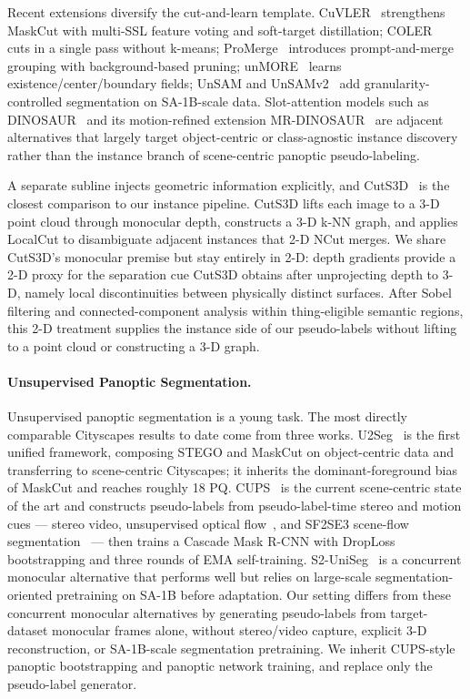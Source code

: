 \documentclass[10pt,twocolumn,letterpaper]{article}
\begin{document}
Recent extensions diversify the cut-and-learn template. CuVLER~\cite{arica2024cuvler} strengthens MaskCut with multi-SSL feature voting and soft-target distillation; COLER~\cite{feng2025coler} cuts in a single pass without k-means; ProMerge~\cite{li2024promerge} introduces prompt-and-merge grouping with background-based pruning; unMORE~\cite{yang2025unmore} learns existence/center/boundary fields; UnSAM and UnSAMv2~\cite{wang2024unsam,yu2025unsamv2} add granularity-controlled segmentation on SA-1B-scale data. Slot-attention models such as DINOSAUR~\cite{seitzer2023dinosaur} and its motion-refined extension MR-DINOSAUR~\cite{gong2025mrdinosaur} are adjacent alternatives that largely target object-centric or class-agnostic instance discovery rather than the instance branch of scene-centric panoptic pseudo-labeling.

A separate subline injects geometric information explicitly, and CutS3D~\cite{sick2025cuts3d} is the closest comparison to our instance pipeline. CutS3D lifts each image to a 3-D point cloud through monocular depth, constructs a 3-D k-NN graph, and applies LocalCut to disambiguate adjacent instances that 2-D NCut merges. We share CutS3D's monocular premise but stay entirely in 2-D: depth gradients provide a 2-D proxy for the separation cue CutS3D obtains after unprojecting depth to 3-D, namely local discontinuities between physically distinct surfaces. After Sobel filtering and connected-component analysis within thing-eligible semantic regions, this 2-D treatment supplies the instance side of our pseudo-labels without lifting to a point cloud or constructing a 3-D graph.

\paragraph{Unsupervised Panoptic Segmentation.}
Unsupervised panoptic segmentation is a young task. The most directly comparable Cityscapes results to date come from three works. U2Seg~\cite{niu2024u2seg} is the first unified framework, composing STEGO and MaskCut on object-centric data and transferring to scene-centric Cityscapes; it inherits the dominant-foreground bias of MaskCut and reaches roughly 18 PQ. CUPS~\cite{hahn2025cups} is the current scene-centric state of the art and constructs pseudo-labels from pseudo-label-time stereo and motion cues --- stereo video, unsupervised optical flow~\cite{stone2021smurf}, and SF2SE3 scene-flow segmentation~\cite{sommer2022sf2se3} --- then trains a Cascade Mask R-CNN with DropLoss bootstrapping and three rounds of EMA self-training. S2-UniSeg~\cite{xu2025s2uniseg} is a concurrent monocular alternative that performs well but relies on large-scale segmentation-oriented pretraining on SA-1B before adaptation. Our setting differs from these concurrent monocular alternatives by generating pseudo-labels from target-dataset monocular frames alone, without stereo/video capture, explicit 3-D reconstruction, or SA-1B-scale segmentation pretraining. We inherit CUPS-style panoptic bootstrapping and panoptic network training, and replace only the pseudo-label generator.
\end{document}
